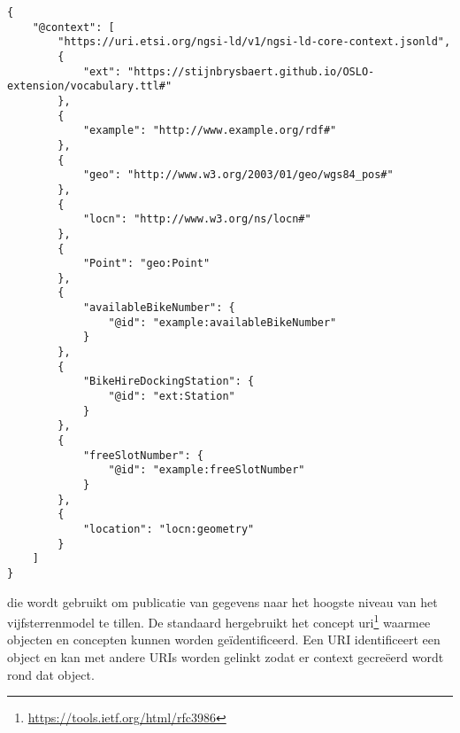 \begin{code}
\begin{verbatim}
{
    "@context": [
        "https://uri.etsi.org/ngsi-ld/v1/ngsi-ld-core-context.jsonld",
        {
            "ext": "https://stijnbrysbaert.github.io/OSLO-extension/vocabulary.ttl#"
        },
        {
            "example": "http://www.example.org/rdf#"
        },
        {
            "geo": "http://www.w3.org/2003/01/geo/wgs84_pos#"
        },
        {
            "locn": "http://www.w3.org/ns/locn#"
        },
        {
            "Point": "geo:Point"
        },
        {
            "availableBikeNumber": {
                "@id": "example:availableBikeNumber"
            }
        },
        {
            "BikeHireDockingStation": {
                "@id": "ext:Station"
            }
        },
        {
            "freeSlotNumber": {
                "@id": "example:freeSlotNumber"
            }
        },
        {
            "location": "locn:geometry"
        }
    ]
}
\end{verbatim}
\end{code}

die wordt gebruikt om publicatie van gegevens naar het hoogste niveau van het vijfsterrenmodel te tillen. De standaard hergebruikt het concept \acrfull{uri}\footnote{\url{https://tools.ietf.org/html/rfc3986}} waarmee objecten en concepten kunnen worden geïdentificeerd. Een URI identificeert een object en kan met andere URIs worden gelinkt zodat er context gecreëerd wordt rond dat object.